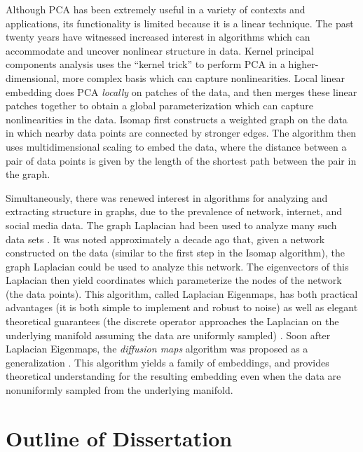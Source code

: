 Although PCA has been extremely useful in a variety of contexts and applications, its functionality is limited because it is a linear technique. 
%
The past twenty years have witnessed increased interest in algorithms which can accommodate and uncover nonlinear structure in data.
%
Kernel principal components analysis \cite{scholkopf1997kernel} uses the ``kernel trick'' to perform PCA in a higher-dimensional, more complex basis which can capture nonlinearities. 
%
Local linear embedding \cite{roweis2000nonlinear} does PCA {\em locally} on patches of the data, and then merges these linear patches together to obtain a global parameterization which can capture nonlinearities in the data. 
%
Isomap \cite{tenenbaum2000global} first constructs a weighted graph on the data in which nearby data points are connected by stronger edges.
%
The algorithm then uses multidimensional scaling \cite{joseph1978multidimensional} to embed the data, where the distance between a pair of data points is given by the length of the shortest path between the pair in the graph. 

Simultaneously, there was renewed interest in algorithms for analyzing and extracting structure in graphs, due to the prevalence of network, internet, and social media data. 
%
The graph Laplacian had been used to analyze many such data sets \cite{shi2000normalized, ng2002spectral}. 
%
It was noted approximately a decade ago that, given a network constructed on the data (similar to the first step in the Isomap algorithm), the graph Laplacian could be used to analyze this network. 
%
The eigenvectors of this Laplacian then yield coordinates which parameterize the nodes of the network (the data points). 
%
This algorithm, called Laplacian Eigenmaps, has both practical advantages (it is both simple to implement and robust to noise) as well as elegant theoretical guarantees (the discrete operator approaches the Laplacian on the underlying manifold assuming the data are uniformly sampled) \cite{Belkin2003}. 
%
Soon after Laplacian Eigenmaps, the {\em diffusion maps} algorithm was proposed as a generalization \cite{coifman2005geometric, coifman2006geometric}. 
%
This algorithm yields a family of embeddings, and provides theoretical understanding for the resulting embedding even when the data are nonuniformly sampled from the underlying manifold. 


\section{Outline of Dissertation}

